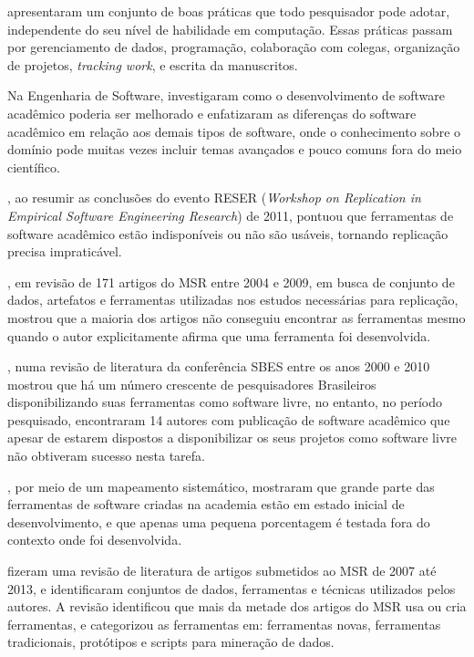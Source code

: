  apresentaram um conjunto de boas práticas que todo
pesquisador pode adotar, independente do seu nível de habilidade em
computação. Essas práticas passam por gerenciamento de dados, programação,
colaboração com colegas, organização de projetos, {\it tracking work}, e escrita da
manuscritos.


Na Engenharia de Software, 
investigaram como o desenvolvimento de software acadêmico poderia ser melhorado e
enfatizaram as diferenças do software acadêmico em relação aos demais tipos de
software, onde o conhecimento sobre o domínio pode muitas vezes incluir temas
avançados e pouco comuns fora do meio científico.

,
ao resumir as conclusões do evento RESER ({\it Workshop on Replication in Empirical
Software Engineering Research}) de 2011, pontuou que ferramentas de software
acadêmico estão indisponíveis ou não são usáveis, tornando
replicação precisa impraticável.

, em revisão de 171 artigos do MSR entre 2004 e 2009,
em busca de conjunto de dados, artefatos e ferramentas utilizadas nos estudos
necessárias para replicação, mostrou que a maioria dos artigos não conseguiu encontrar
as ferramentas mesmo quando o autor explicitamente afirma que uma ferramenta foi desenvolvida.

, numa revisão de literatura da conferência SBES entre
os anos 2000 e 2010 mostrou que há um número crescente de pesquisadores
Brasileiros disponibilizando suas ferramentas como software livre, no entanto,
no período pesquisado, encontraram 14 autores com publicação de software acadêmico
que apesar de estarem dispostos a disponibilizar os seus projetos como software
livre não obtiveram sucesso nesta tarefa.

, por meio de
um mapeamento sistemático, mostraram que grande parte das ferramentas de
software criadas na academia estão em estado inicial de desenvolvimento, e que
apenas uma pequena porcentagem é testada fora do contexto onde foi
desenvolvida. 

fizeram uma revisão de literatura de artigos submetidos ao MSR de 2007 até 2013,
e identificaram conjuntos de dados, ferramentas e técnicas utilizados pelos autores.
A revisão identificou que mais da metade dos artigos do MSR usa ou cria ferramentas,
e categorizou as ferramentas em:
ferramentas novas, ferramentas tradicionais, protótipos e scripts para
mineração de dados.

